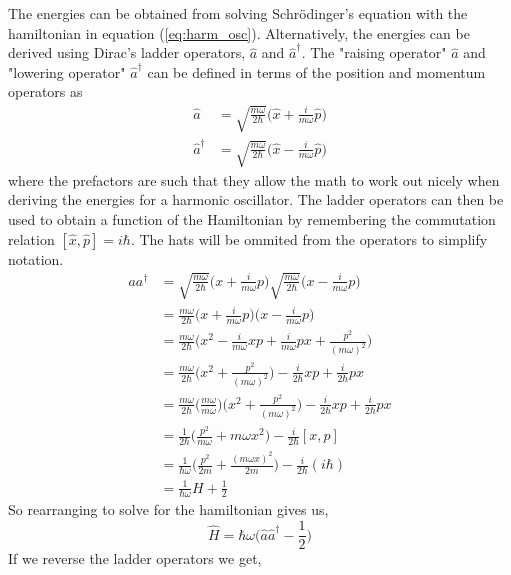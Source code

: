 \documentclass{article}
\newcommand{\be}{\begin{equation}}
\newcommand{\ee}{\end{equation}}
\begin{document}
The energies can be obtained from solving Schr\"odinger's equation with the hamiltonian in equation (\ref{eq:harm_osc}).
Alternatively, the energies can be derived using Dirac's ladder operators, $\hat{a}$ and $\hat{a}^{\dagger}$.\cite{griffiths,shankar}
The "raising operator" $\hat{a}$ and "lowering operator" $\hat{a}^{\dagger}$ can be defined in terms of the position and momentum operators as
\be
  \begin{split}
    \hat{a} &= \sqrt{\frac{m \omega}{2 \hbar}} \Big( \hat{x} + \frac{i}{m \omega} \hat{p}\Big) \\
    \hat{a}^{\dagger} &= \sqrt{\frac{m \omega}{2 \hbar}} \Big( \hat{x} - \frac{i}{m \omega} \hat{p}\Big)
  \end{split}
\ee
where the prefactors are such that they allow the math to work out nicely when deriving the energies for a harmonic oscillator.
The ladder operators can then be used to obtain a function of the Hamiltonian by remembering the commutation relation $[\hat{x},\hat{p}] = i \hbar$. The hats will be ommited from the operators to simplify notation.
\be
  \begin{split}
    aa^{\dagger} &= \sqrt{\frac{m \omega}{2 \hbar}} \Big( x + \frac{i}{m \omega} p\Big) \sqrt{\frac{m \omega}{2 \hbar}} \Big( x - \frac{i}{m \omega} p\Big) \\
    &= \frac{m \omega}{2 \hbar} \Big( x + \frac{i}{m \omega} p\Big) \Big( x - \frac{i}{m \omega} p\Big) \\
    &= \frac{m \omega}{2 \hbar} \Big( x^2 - \frac{i}{m \omega}xp + \frac{i}{m \omega}px + \frac{p^2}{(m \omega)^2} \Big) \\
    &= \frac{m \omega}{2 \hbar} \Big( x^2 + \frac{p^2}{(m \omega)^2} \Big) - \frac{i}{2 \hbar}xp + \frac{i}{2 \hbar}px \\
    &= \frac{m \omega}{2 \hbar} \Big( \frac{m \omega}{m \omega} \Big) \Big( x^2 + \frac{p^2}{(m \omega)^2} \Big) - \frac{i}{2 \hbar}xp + \frac{i}{2 \hbar}px \\
    &= \frac{1}{2 \hbar} \Big( \frac{p^2}{m \omega} + m \omega x^2\Big) - \frac{i}{2 \hbar} [x,p] \\
    &= \frac{1}{\hbar \omega} \Big( \frac{p^2}{2m} + \frac{(m \omega x)^2}{2m}\Big) - \frac{i}{2 \hbar} (i \hbar) \\
    &= \frac{1}{\hbar \omega} H + \frac{1}{2}
  \end{split}
\ee
So rearranging to solve for the hamiltonian gives us,
\be \label{eq:h_plusminus}
  \hat{H} = \hbar \omega \Big( \hat{a} \hat{a}^{\dagger} - \frac{1}{2} \Big)
\ee
If we reverse the ladder operators we get,
\end{document}
